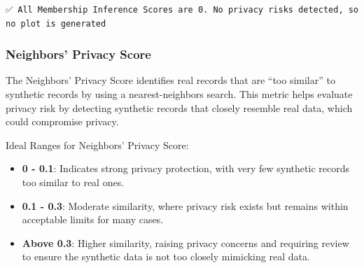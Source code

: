 \documentclass[
  letterpaper,
  DIV=11,
  numbers=noendperiod]{scrartcl}
\providecommand{\tightlist}{%
  \setlength{\itemsep}{0pt}\setlength{\parskip}{0pt}}\usepackage{longtable,booktabs,array}
\begin{document}
\begin{verbatim}
✅ All Membership Inference Scores are 0. No privacy risks detected, so no plot is generated
\end{verbatim}

\subsubsection{Neighbors' Privacy Score}\label{neighbors-privacy-score}

The Neighbors' Privacy Score identifies real records that are ``too
similar'' to synthetic records by using a nearest-neighbors search. This
metric helps evaluate privacy risk by detecting synthetic records that
closely resemble real data, which could compromise privacy.

Ideal Ranges for Neighbors' Privacy Score:

\begin{itemize}
\tightlist
\item
  \textbf{0 - 0.1}: Indicates strong privacy protection, with very few
  synthetic records too similar to real ones.
\item
  \textbf{0.1 - 0.3}: Moderate similarity, where privacy risk exists but
  remains within acceptable limits for many cases.
\item
  \textbf{Above 0.3}: Higher similarity, raising privacy concerns and
  requiring review to ensure the synthetic data is not too closely
  mimicking real data.
\end{itemize}
\end{document}

